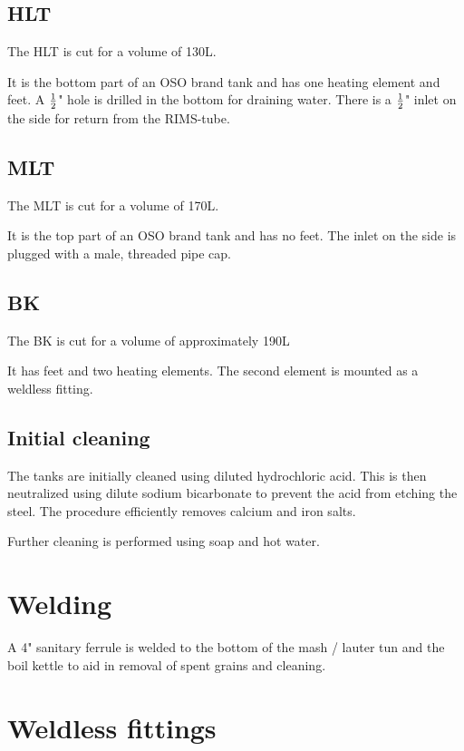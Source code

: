 \documentclass[11pt,fleqn,openany]{book} %
\begin{document}
\subsection{HLT}

The HLT is cut for a volume of 130L.

It is the bottom part of an OSO brand tank and has one heating element and feet. A $1 \over 2$" hole is drilled in the bottom for draining water.  There is a $1 \over 2$" inlet on the side for return from the RIMS-tube.

\subsection{MLT}

The MLT is cut for a volume of 170L. 

It is the top part of an OSO brand tank and has no feet. The inlet on the side is plugged with a male, threaded pipe cap.

\subsection{BK}

The BK is cut for a volume of approximately 190L

It has feet and two heating elements. The second element is mounted as a weldless fitting.

\subsection{Initial cleaning}

The tanks are initially cleaned using diluted hydrochloric acid. This is then neutralized using dilute sodium bicarbonate to prevent the acid from etching the steel. The procedure efficiently removes calcium and iron salts.

Further cleaning is performed using soap and hot water.

\section{Welding}

A 4" sanitary ferrule is welded to the bottom of the mash / lauter tun and the boil kettle to aid in removal of spent grains and cleaning.

\section{Weldless fittings}
\end{document}
